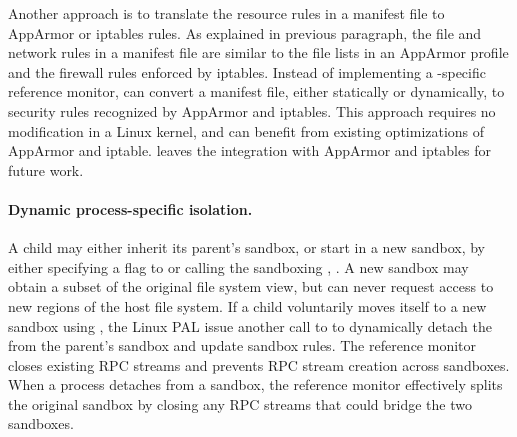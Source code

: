 Another approach is to translate the resource rules in a manifest file
to AppArmor or iptables rules.
As explained in previous paragraph, the file and network rules in a manifest file are similar to the file lists in an AppArmor profile and the firewall rules enforced by iptables.
Instead of implementing a \graphene{}-specific reference monitor,
\graphene{} can convert a manifest file, either statically or dynamically,
to security rules recognized by AppArmor and iptables.
This approach requires no modification
in a Linux kernel, and can benefit from
existing optimizations of AppArmor and iptable. %
\graphene{} leaves the integration with AppArmor and iptables for future work.




\paragraph{Dynamic process-specific isolation.}
A child \picoproc{} may either inherit its parent's sandbox, 
or start in a new sandbox,
by either specifying a flag to  or calling the sandboxing \hostapi{}, .
A new sandbox may obtain a subset of the original file system view,
but can never request access to new regions of the 
host file system. 
If a child \picoproc{} voluntarily moves itself to a new sandbox
using ,
the Linux PAL issue another  call to 
to dynamically detach
the \picoproc{}
from the parent's sandbox and update sandbox rules. The reference monitor
closes existing RPC streams and prevents RPC stream creation 
across sandboxes.
When a process detaches from a sandbox,
the reference monitor effectively splits the original sandbox
by closing any RPC streams that could bridge the two sandboxes.


\begin{comment}
We hasten to note that program counter filtering
is only provided for backwards compatibility, not security.
An attacker can compromise the \pal{}, so system policies are enforced
externally by the reference monitor.


Dynamically redirecting system calls to {\tt libLinux} is 
less efficient than dynamically linking against
the \graphene{} libc or statically compiling {\tt libLinux} into the application.
The overhead of dynamic redirection comes from 
transferring control to the kernel, then back to 
the \pal{}, and then to {\tt libLinux}.
We leave exploration of more efficient alternatives for future work,
such as redirecting the hardware system call table to {\tt libLinux}
on a host system like Dune~\cite{belay12dune},
or dynamically rewriting parts of the static binary~\cite{hunt99detours}.
\end{comment}

